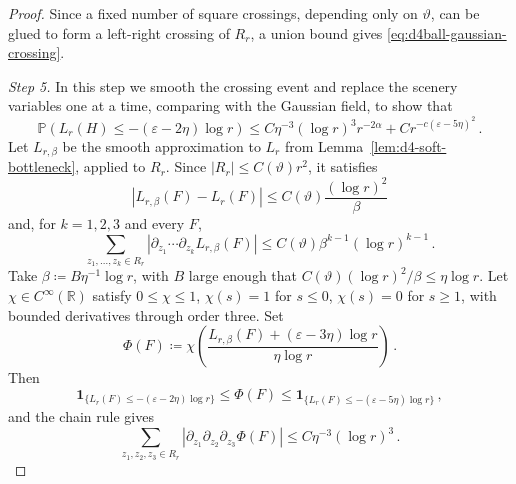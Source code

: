 \documentclass[11pt]{amsart}
\theoremstyle{plain}
\theoremstyle{definition}
\newcommand{\R}{\mathbb{R}}
\renewcommand{\P}{\mathbb{P}}
\newcommand{\one}{\mathbf{1}}
\begin{document}
\begin{proof}
Since a fixed number of square crossings, depending only on $\vartheta$, can be
glued to form a left-right crossing of $R_r$, a union bound gives
\eqref{eq:d4ball-gaussian-crossing}.

\smallskip
\noindent\emph{Step 5.} In this step we smooth the crossing event and replace the scenery variables one at a time, comparing with the Gaussian field,
to show that 
\begin{equation}\label{eq:d4ball-far-crossing}
    \P\left(L_r(H)\leq-(\varepsilon-2\eta)\log r\right)
    \leq
    C\eta^{-3}(\log r)^3r^{-2\alpha}
    +
    Cr^{-c(\varepsilon-5\eta)^2}\, .
\end{equation}
Let $L_{r,\beta}$ be the smooth approximation to $L_r$ from
Lemma~\ref{lem:d4-soft-bottleneck}, applied to $R_r$.
Since $|R_r|\leq C(\vartheta) r^2$, it satisfies
\[
    |L_{r,\beta}(F)-L_r(F)|\leq C(\vartheta)\frac{(\log r)^2}{\beta}
\]
and, for $k=1,2,3$ and every $F$,
\[
    \sum_{z_1,\ldots,z_k\in R_r}
    |\partial_{z_1}\cdots\partial_{z_k}L_{r,\beta}(F)|
    \leq C(\vartheta)\beta^{k-1}(\log r)^{k-1}\, .
\]
	Take $\beta\coloneqq B\eta^{-1}\log r$, with $B$ large enough that
	$C(\vartheta)(\log r)^2/\beta\leq\eta\log r$. Let
$\chi\in C^\infty(\R)$ satisfy $0\leq\chi\leq1$, $\chi(s)=1$ for
$s\leq0$, $\chi(s)=0$ for $s\geq1$, with bounded derivatives through
	order three. Set
	\[
		\Phi(F)\coloneqq
		\chi\left(
		\frac{L_{r,\beta}(F)+(\varepsilon-3\eta)\log r}{\eta\log r}
		\right)\, .
\]
Then
\begin{equation}\label{eq:d4ball-phi-comparison}
	\one_{\{L_r(F)\leq-(\varepsilon-2\eta)\log r\}}
	\leq \Phi(F)\leq
	\one_{\{L_r(F)\leq-(\varepsilon-5\eta)\log r\}}\, ,
\end{equation}
and the chain rule gives
\begin{equation}\label{eq:d4ball-phi-third}
    \sum_{z_1,z_2,z_3\in R_r}
    |\partial_{z_1}\partial_{z_2}\partial_{z_3}\Phi(F)|
    \leq C\eta^{-3}(\log r)^3\, .
\end{equation}


\end{proof}
\end{document}

